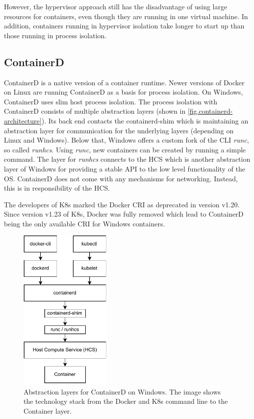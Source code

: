 However, the hypervisor approach still has the disadvantage of using large resources for containers, even though they are running in one virtual machine. In addition, containers running in hypervisor isolation take longer to start up than those running in process isolation\cite{RamosApolinario.2021}.


\subsection{ContainerD}
ContainerD is a native version of a container runtime. Newer versions of Docker on Linux are running ContainerD as a basis for process isolation. On \ac{Windows}, ContainerD uses slim host process isolation.  The process isolation with ContainerD consists of multiple abstraction layers (shown in \autoref{fig.containerd-architecture}). Its back end contacts the containerd-shim which is maintaining an abstraction layer for communication for the underlying layers (depending on Linux and \ac{Windows}). Below that, \ac{Windows} offers a custom fork of the \ac{CLI} \textit{runc}, so called \textit{runhcs}\cite{Scooley.2022}. Using \textit{runc}, new containers can be created by running a simple command\cite{Scooley.2022}. The layer for \textit{runhcs} connects to the \ac{HCS} which is another abstraction layer of \ac{Windows} for providing a stable \ac{API} to the low level functionality of the \ac{OS}\cite{Microsoft.2017}. ContainerD does not come with any mechanisms for networking. Instead, this is in responsibility of the \ac{HCS}.

The developers of \ac{K8s} marked the Docker \ac{CRI} as deprecated in version v1.20\cite{Kubernetes.2020}. Since version v1.23 of \ac{K8s}, Docker was fully removed which lead to ContainerD being the only available \ac{CRI} for \ac{Windows} containers.

\begin{figure}[hb]
	\centering
	\includegraphics[width=0.4\textwidth]{Figures/containerd-architecture.pdf}
	\caption{Abstraction layers for ContainerD on Windows. The image shows the technology stack from the Docker and \ac{K8s} command line to the Container layer.\cite{Scooley.2022}}
	\label{fig.containerd-architecture}
\end{figure}

